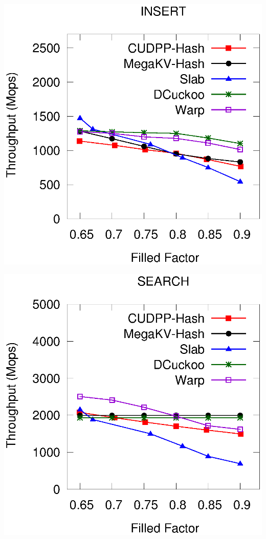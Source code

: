 \begin{minipage}{\textwidth}
	\begin{minipage}[b]{0.49\textwidth}\centering
		\begin{minipage}{0.49\textwidth}\centering
			\includegraphics[width=\textwidth]{../pic/static-load_factor/ali/insert.eps}
			\centerline{}
		\end{minipage}
		\begin{minipage}{0.49\textwidth}\centering
			\includegraphics[width=\textwidth]{../pic/static-load_factor/ali/search.eps}

\end{minipage}
\end{minipage}
\end{minipage}
